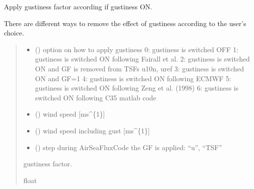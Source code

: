 \documentclass[letterpaper,10pt,english]{sphinxmanual}
\begin{document}
\begin{fulllineitems}
\label{\detokenize{users_guide:AirSeaFluxCode.flux_subs.apply_GF}}
\pysigstartsignatures
{}
\pysigstopsignatures
\sphinxAtStartPar
Apply gustiness factor according if gustiness ON.

\sphinxAtStartPar
There are different ways to remove the effect of gustiness according to
the user’s choice.
\begin{quote}\begin{description}
\begin{itemize}
\item {} 
\sphinxAtStartPar
{} () \textendash{} option on how to apply gustiness
0: gustiness is switched OFF
1: gustiness is switched ON following Fairall et al.
2: gustiness is switched ON and GF is removed from TSFs u10n, uref
3: gustiness is switched ON and GF=1
4: gustiness is switched ON following ECMWF
5: gustiness is switched ON following Zeng et al. (1998)
6: gustiness is switched ON following C35 matlab code

\item {} 
\sphinxAtStartPar
{} () \textendash{} wind speed                      {[}ms\textasciicircum{}\{\sphinxhyphen{}1\}{]}

\item {} 
\sphinxAtStartPar
{} () \textendash{} wind speed including gust       {[}ms\textasciicircum{}\{\sphinxhyphen{}1\}{]}

\item {} 
\sphinxAtStartPar
{} () \textendash{} step during AirSeaFluxCode the GF is applied: “u”, “TSF”

\end{itemize}

\sphinxAtStartPar
{} \textendash{} gustiness factor.

\sphinxAtStartPar
float

\end{description}\end{quote}

\end{fulllineitems}
\end{document}
